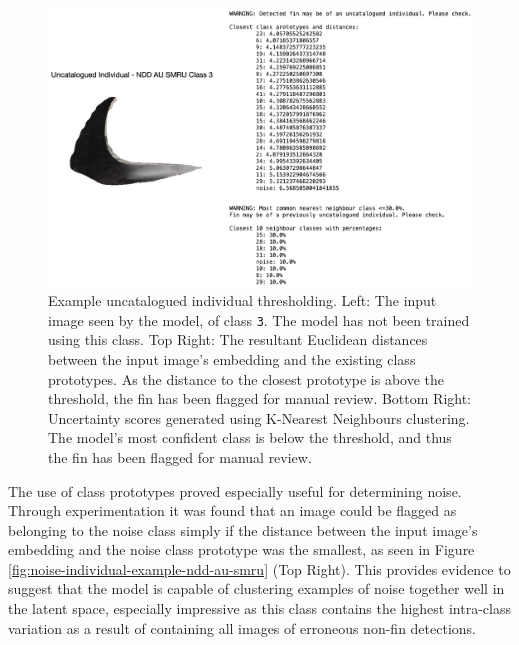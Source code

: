 \begin{figure}[t]
	\begin{center}
		\includegraphics[scale=0.6]{Chapter5/figs/uncatalogued-individual-example-ndd-au-smru.png}
	\end{center}
	\caption{Example uncatalogued individual thresholding. Left: The input image seen by the model, of class \texttt{3}. The model has not been trained using this class. Top Right: The resultant Euclidean distances between the input image's embedding and the existing class prototypes. As the distance to the closest prototype is above the threshold, the fin has been flagged for manual review. Bottom Right: Uncertainty scores generated using K-Nearest Neighbours clustering. The model's most confident class is below the threshold, and thus the fin has been flagged for manual review.}
	\label{fig:uncatalogued-individual-example-ndd-au-smru}
\end{figure}

The use of class prototypes proved especially useful for determining noise. Through experimentation it was found that an image could be flagged as belonging to the noise class simply if the distance between the input image's embedding and the noise class prototype was the smallest, as seen in Figure \ref{fig:noise-individual-example-ndd-au-smru} (Top Right). This provides evidence to suggest that the model is capable of clustering examples of noise together well in the latent space, especially impressive as this class contains the highest intra-class variation as a result of containing all images of erroneous non-fin detections.

